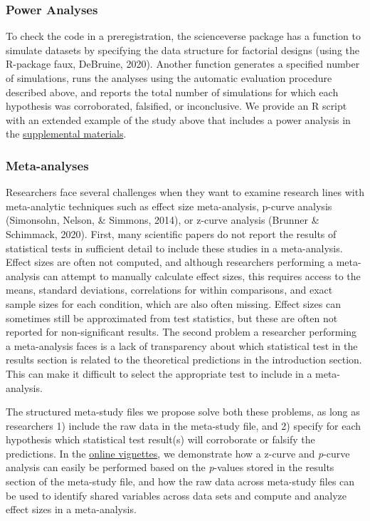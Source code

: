 \documentclass[
  english,
  doc,floatsintext]{apa6}
\begin{document}
\hypertarget{power-analyses}{%
\subsubsection{Power Analyses}\label{power-analyses}}

To check the code in a preregistration, the scienceverse package has a function to simulate datasets by specifying the data structure for factorial designs (using the R-package faux, DeBruine, 2020). Another function generates a specified number of simulations, runs the analyses using the automatic evaluation procedure described above, and reports the total number of simulations for which each hypothesis was corroborated, falsified, or inconclusive. We provide an R script with an extended example of the study above that includes a power analysis in the \href{example/extended/ext_example.Rmd}{supplemental materials}.

\hypertarget{meta-analyses}{%
\subsubsection{Meta-analyses}\label{meta-analyses}}

Researchers face several challenges when they want to examine research lines with meta-analytic techniques such as effect size meta-analysis, p-curve analysis (Simonsohn, Nelson, \& Simmons, 2014), or z-curve analysis (Brunner \& Schimmack, 2020). First, many scientific papers do not report the results of statistical tests in sufficient detail to include these studies in a meta-analysis. Effect sizes are often not computed, and although researchers performing a meta-analysis can attempt to manually calculate effect sizes, this requires access to the means, standard deviations, correlations for within comparisons, and exact sample sizes for each condition, which are also often missing. Effect sizes can sometimes still be approximated from test statistics, but these are often not reported for non-significant results. The second problem a researcher performing a meta-analysis faces is a lack of transparency about which statistical test in the results section is related to the theoretical predictions in the introduction section. This can make it difficult to select the appropriate test to include in a meta-analysis.

The structured meta-study files we propose solve both these problems, as long as researchers 1) include the raw data in the meta-study file, and 2) specify for each hypothesis which statistical test result(s) will corroborate or falsify the predictions. In the \href{https://scienceverse.github.io/scienceverse/articles/index.html}{online vignettes}, we demonstrate how a z-curve and \emph{p}-curve analysis can easily be performed based on the \emph{p}-values stored in the results section of the meta-study file, and how the raw data across meta-study files can be used to identify shared variables across data sets and compute and analyze effect sizes in a meta-analysis.
\end{document}
